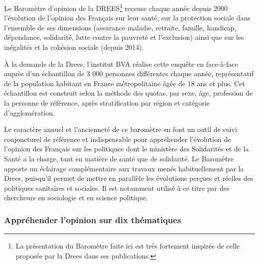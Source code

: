 \documentclass[12pt,a4paper]{reedthesis}
\begin{document}
Le Baromètre d'opinion de la DREES\footnote{La présentation du Baromètre faite ici est très fortement inspirée de celle proposée par la Drees dans ses publications.} recense chaque année depuis 2000 l'évolution de l'opinion des Français sur leur santé, sur la protection sociale dans l'ensemble de ses dimensions (assurance maladie, retraite, famille, handicap, dépendance, solidarité, lutte contre la pauvreté et l'exclusion) ainsi que sur les inégalités et la cohésion sociale (depuis 2014).

À la demande de la Drees, l'institut BVA réalise cette enquête en face-à-face auprès d'un échantillon de 3 000 personnes différentes chaque année, représentatif de la population habitant en France métropolitaine âgée de 18 ans et plus. Cet échantillon est construit selon la méthode des quotas, par sexe, âge, profession de la personne de référence, après stratification par région et catégorie d'agglomération.

Le caractère annuel et l'ancienneté de ce baromètre en font un outil de suivi conjoncturel de référence et indispensable pour appréhender l'évolution de l'opinion des Français sur les politiques dont le ministère des Solidarités et de la Santé a la charge, tant en matière de santé que de solidarité. Le Baromètre apporte un éclairage complémentaire aux travaux menés habituellement par la Drees, puisqu'il permet de mettre en parallèle les évolutions perçues et réelles des politiques sanitaires et sociales. Il est notamment utilisé à ce titre par des chercheurs en sociologie et en science politique.

\hypertarget{appruxe9hender-lopinion-sur-dix-thuxe9matiques}{%
\subsubsection{Appréhender l'opinion sur dix thématiques}\label{appruxe9hender-lopinion-sur-dix-thuxe9matiques}}
\end{document}
